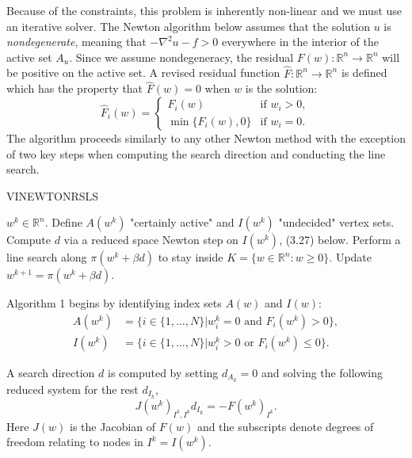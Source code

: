 \documentclass[12 pt]{report}
\newcommand{\RR}{\mathbb{R}}
\begin{document}
Because of the constraints, this problem is inherently non-linear and we must use an iterative solver. The Newton algorithm below assumes that the solution $u$ is \emph{nondegenerate}, meaning that $-\nabla^2 u  - f > 0$ everywhere in the interior of the active set $A_u$. Since we assume nondegeneracy, the residual $F(w): \RR^n \to \RR^n$ will be positive on the active set. A revised residual function $\hat{F}: \RR^n \to \RR^n$ is defined which has the property that $\hat{F}(w) = 0$ when $w$ is the solution:
\begin{equation}
  \hat{F}_i(w) = \begin{cases}
    F_i(w) & \text{if } w_i > 0,\\
    \min\{F_i(w), 0\} & \text{if } w_i = 0.
  \end{cases}
\end{equation}
The algorithm proceeds similarly to any other Newton method with the exception of two key steps when computing the search direction and conducting the line search.
\begin{algorithm}
  \caption{VINEWTONRSLS}
  \begin{algorithmic}
    \Require $w^k \in \RR^n$.
    \State Define $A(w^k)$ "certainly active" and $I(w^k)$ "undecided" vertex sets.
    \State Compute $d$ via a reduced space Newton step on $I(w^k)$, (3.27) below. 
    \State Perform a line search along $\pi(w^k + \beta d)$ to stay inside $K = \{w \in \RR^n: w \geq 0\}$.
    \State Update $w^{k+1} = \pi(w^k + \beta d)$.
  \end{algorithmic}
  \end{algorithm}

Algorithm 1 begins by identifying index sets $A(w)$ and $I(w)$:
\begin{align}
  A(w^k) &= \{i \in \{1, ..., N\}| w_i^k = 0 \text{ and } F_i(w^k) > 0\},\\
  I(w^k) &= \{i \in \{1, ..., N\}| w_i^k > 0 \text{ or } F_i(w^k) \leq 0\}.
\end{align}

A search direction $d$ is computed by setting $d_{A_k} = 0$ and solving the following reduced system for the rest $d_{I_k}$,
\begin{equation}
  J(w^k)_{I^k, I^k}d_{I_k} = -F(w^k)_{I^k}.
\end{equation}
Here $J(w)$ is the Jacobian of $F(w)$ and the subscripts denote degrees of freedom relating to nodes in $I^k = I(w^k)$. 
\end{document}
